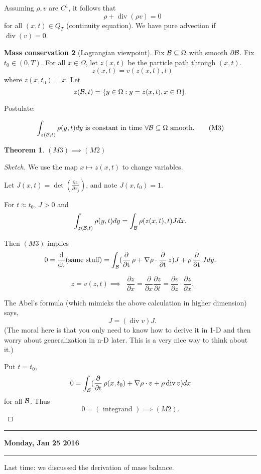 \documentclass[11pt]{amsart}%
\newtheorem{theorem}{Theorem}
\DeclareMathOperator{\dt}{\frac{d}{dt}}
\DeclareMathOperator{\pt}{\frac{\partial}{\partial t}}
\DeclareMathOperator{\dive}{div}
\begin{document}
Assuming $\rho, v$ are $C^1$, it follows that
\[ \pt \rho + \dive(\rho v)=0 \tag{M2}\]
for all $(x,t)\in Q_T$ (continuity equation). We have pure advection if $\dive(v)=0$.

{\bf Mass conservation 2} (Lagrangian viewpoint).
Fix $\mathcal{B}\subseteq \Omega$ with smooth $\partial \mathcal{B}$. Fix $t_0\in (0,T)$. For all $x\in \Omega$, let $z(x,t)$ be the particle path through $(x,t)$.
$$\pt z(x,t) = v(z(x,t),t)$$ where $z(x,t_0) =x$. Let $$z(\mathcal{B},t) = \{ y\in\Omega: y=z(x,t), x\in \Omega\}.$$

Postulate:

\[ \int_{z(\mathcal{B}, t)} \rho(y,t)dy \text{ is constant in time $\forall \mathcal{B}\subseteq \Omega$ smooth.} \tag{M3}\]

\begin{theorem}
    $(M3)\implies(M2)$
\end{theorem}
\begin{proof}[Sketch]
    We use the map $x\mapsto z(x,t)$ to change variables.
    
    Let $J(x,t)=\det (\frac{\partial z_i}{\partial x_j})$, and note $J(x,t_0)=1$.
    
    For $t\approx t_0$, $J>0$ and
    $$\int_{z(\mathcal{B},t)} \rho(y,t)dy=\int_{\mathcal{B}}\rho(z(x,t),t)J dx.$$
    
    Then $(M3)$ implies
    $$0=\dt (\text{same stuff} ) =\int_{\cB}(\pt\rho +\nabla \rho\cdot \pt z)J + \rho\pt J dy.$$
    
    $$\pt z= v(z,t)\implies \pt \frac{\partial z}{\partial x}=\frac{\partial}{\partial x}\frac{\partial z}{\partial t} =\frac{\partial v}{\partial z}\cdot\frac{\partial z}{\partial x}.$$
    
    The Abel's formula (which mimicks the above calculation in higher dimension) says,
    $$\dt J = (\dive v)J.$$
    (The moral here is that you only need to know how to derive it in 1-D and then worry about generalization in n-D later. This is a very nice way to think about it.)
    
    Put $t=t_0$,
    $$0=\int_{\cB}(\pt\rho(x,t_0)+\nabla\rho\cdot v + \rho\dive v) dx$$
    for all $\mathcal{B}$. Thus
    $$0=(\text{ integrand })\implies (M2).$$
\end{proof}

\begin{center}\rule{0.5\linewidth}{\linethickness}\end{center}

\textbf{Monday, Jan 25 2016}

\begin{center}\rule{0.5\linewidth}{\linethickness}\end{center}
Last time: we discussed the derivation of mass balance.
\end{document}

